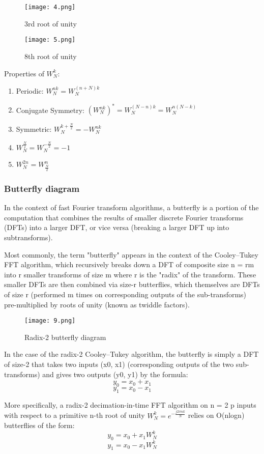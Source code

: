 \documentclass[12pt,a4paper]{article}
\begin{document}
\begin{center}
\begin{figure}[hbtp]
\centering
\texttt{[image: 4.png]}
\caption{3rd root of unity}
\end{figure}
\end{center}
\begin{figure}[hbtp]
\centering
\texttt{[image: 5.png]}
\caption{8th root of unity}
\end{figure}
\newpage
Properties of $W_N^k$:
\begin{enumerate}
\item Periodic: $W_N^{nk}=W_N^{(n+N)k}$
\item Conjugate Symmetry: $(W_N^{nk})^*=W_N^{(N-n)k}=W_N^{n(N-k)}$
\item Symmetric: $W_N^{k+\frac{N}{2}}=-W_N^{nk}$
\item $W_N^{\frac{N}{2}}=W_N^{-\frac{N}{2}}=-1$
\item $W_N^{2n}=W_{\frac{N}{2}}^{n}$
\end{enumerate}

\subsubsection{Butterfly diagram}
In the context of fast Fourier transform algorithms, a butterfly is a portion of the computation that combines the results of smaller discrete Fourier transforms (DFTs) into a larger DFT, or vice versa (breaking a larger DFT up into subtransforms). 


Most commonly, the term "butterfly" appears in the context of the Cooley–Tukey FFT algorithm, which recursively breaks down a DFT of composite size n = rm into r smaller transforms of size m where r is the "radix" of the transform. These smaller DFTs are then combined via size-r butterflies, which themselves are DFTs of size r (performed m times on corresponding outputs of the sub-transforms) pre-multiplied by roots of unity (known as twiddle factors). 
\begin{figure}[hbtp]
\centering
\texttt{[image: 9.png]}
\caption{Radix-2 butterfly diagram}
\end{figure}

In the case of the radix-2 Cooley–Tukey algorithm, the butterfly is simply a DFT of size-2 that takes two inputs (x0, x1) (corresponding outputs of the two sub-transforms) and gives two outputs (y0, y1) by the formula:
$$y_0=x_0+x_1$$
$$y_1=x_0-x_1$$

More specifically, a radix-2 decimation-in-time FFT algorithm on n = 2 p inputs with respect to a primitive n-th root of unity $W _{N}^{k}=e^{-{\frac {j2\pi n
k}{N}}}$ relies on O(nlogn) butterflies of the form:
$$y_0=x_0+x_1 W _{N}^{k}$$
$$y_1=x_0-x_1 W _{N}^{k}$$
\end{document}
